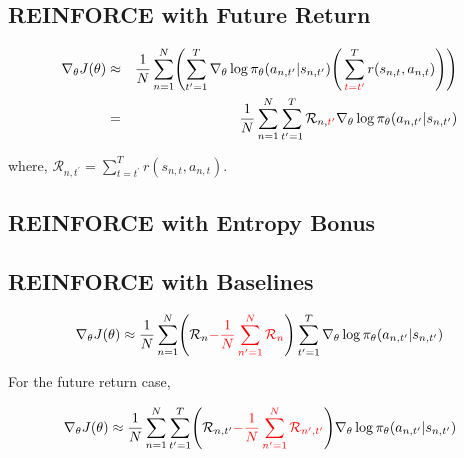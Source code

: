 \documentclass{article}
\begin{document}
\subsection{REINFORCE with Future Return}

\begin{eqnarray}
\nabla_\theta J(\theta) 
&\approx& \frac{1}{N} \sum_{n=1}^{N} \Biggl( \sum_{t^\prime=1}^{T} \nabla_\theta \log \pi_\theta (a_{n, t^\prime}|s_{n, t^\prime}) \Biggl(\, \sum_{{\color{red}{t=t^\prime}}}^{T} r(s_{n, t}, a_{n, t}) \Biggr) \Biggr)  \\
&=& \frac{1}{N} \sum_{n=1}^{N} \sum_{t^\prime=1}^{T} \mathcal{R}_{n, {\color{red}{t^\prime}}} \nabla_\theta \log \pi_\theta (a_{n, t^\prime}|s_{n, t^\prime}) 
\end{eqnarray}

where, $\mathcal{R}_{n, t^\prime} = \sum_{t=t^\prime}^T r(s_{n, t}, a_{n, t})$.


\subsection{REINFORCE with Entropy Bonus}
\subsection{REINFORCE with Baselines}

\begin{eqnarray}
\nabla_\theta J(\theta) 
\approx \frac{1}{N} \sum_{n=1}^{N} \Biggl(\mathcal{R}_n {\color{red}{- \frac{1}{N} \sum_{n^\prime=1}^N \mathcal{R}_n }} \Biggr)\sum_{t^\prime=1}^{T} \nabla_\theta \log \pi_\theta (a_{n, t^\prime}|s_{n, t^\prime}) 
\end{eqnarray}

For the future return case, 

\begin{eqnarray}
\nabla_\theta J(\theta) 
\approx \frac{1}{N} \sum_{n=1}^{N} \sum_{t^\prime=1}^{T} \Biggl(\mathcal{R}_{n, t^\prime} {\color{red}{- \frac{1}{N} \sum_{n^\prime=1}^N \mathcal{R}_{n^\prime, t^\prime} }} \Biggr)  \nabla_\theta \log \pi_\theta (a_{n, t^\prime}|s_{n, t^\prime}) 
\end{eqnarray}




\end{document}
